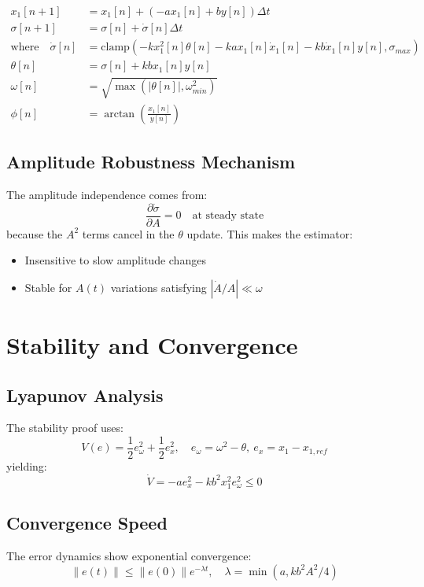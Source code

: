 \documentclass{article}
\begin{document}
\begin{align}
x_1[n+1] &= x_1[n] + (-a x_1[n] + b y[n])\Delta t \label{eq:x1_disc} \\
\sigma[n+1] &= \sigma[n] + \dot{\sigma}[n]\Delta t \label{eq:sigma_disc} \\
\text{where}\quad \dot{\sigma}[n] &= \text{clamp}\left(-k x_1^2[n] \theta[n] - k a x_1[n] \dot{x}_1[n] - k b \dot{x}_1[n] y[n], \sigma_{max}\right) \nonumber \\
\theta[n] &= \sigma[n] + k b x_1[n] y[n] \nonumber \\
\omega[n] &= \sqrt{\max(|\theta[n]|, \omega_{min}^2)} \nonumber \\
\phi[n] &= \arctan\left(\frac{x_1[n]}{y[n]}\right) \nonumber
\end{align}

\subsection{Amplitude Robustness Mechanism}
The amplitude independence comes from:
\begin{equation}
\frac{\partial \dot{\sigma}}{\partial A} = 0 \quad \text{at steady state}
\end{equation}
because the $A^2$ terms cancel in the $\theta$ update. This makes the estimator:
\begin{itemize}
\item Insensitive to slow amplitude changes
\item Stable for $A(t)$ variations satisfying $|\dot{A}/A| \ll \omega$
\end{itemize}

\section{Stability and Convergence}

\subsection{Lyapunov Analysis}
The stability proof uses:
\begin{equation}
V(e) = \frac{1}{2}e_\omega^2 + \frac{1}{2}e_x^2, \quad e_\omega = \omega^2 - \theta, \ e_x = x_1 - x_{1,ref}
\end{equation}
yielding:
\begin{equation}
\dot{V} = -a e_x^2 - k b^2 x_1^2 e_\omega^2 \leq 0
\end{equation}

\subsection{Convergence Speed}
The error dynamics show exponential convergence:
\begin{equation}
\|e(t)\| \leq \|e(0)\| e^{-\lambda t}, \quad \lambda = \min(a, k b^2 A^2/4)
\end{equation}
\end{document}
